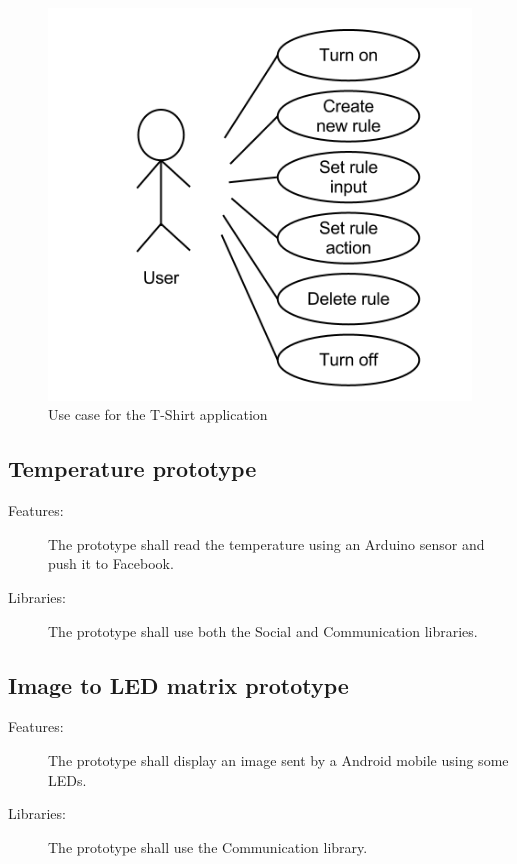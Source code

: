 	\begin{figure}[h!]
	\centering \includegraphics[scale=0.50]{img/req-tshirtappusecase.png}
	\caption{Use case for the T-Shirt application}
	\label{fig:req-tshirtappusecase}
	\end{figure}

	\newpage

	\subsection{Temperature prototype}
	\begin{description}
		\item[Features:] The prototype shall read the temperature
		using an Arduino sensor and push it to Facebook.
		\item[Libraries:] The prototype shall use both the Social and
		Communication libraries.
		\item[]
	\end{description}
	
	\subsection{Image to LED matrix prototype}
	\begin{description}
		\item[Features:] The prototype shall display an image sent by a Android
		mobile using some LEDs.
		\item[Libraries:] The prototype shall use the Communication library.
		\item[]
	\end{description}



